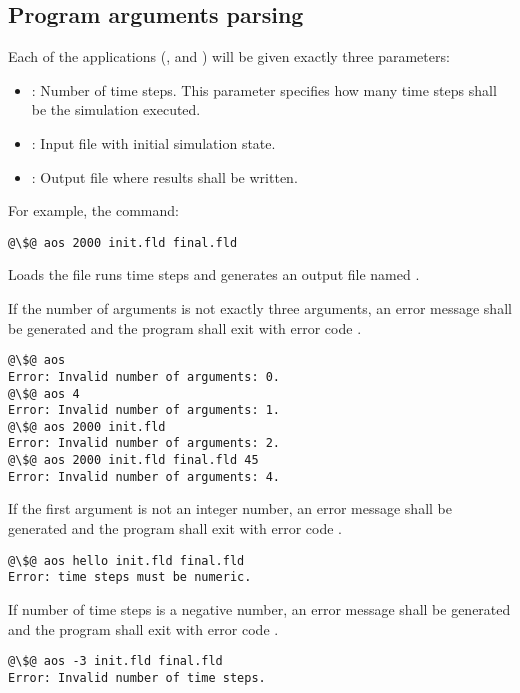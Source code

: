 \subsection{Program arguments parsing}

Each of the applications (, and
) will be given exactly three parameters:

\begin{itemize}
\item {}: Number of time steps. This parameter specifies how many
time steps shall be the simulation executed.
\item {}: Input file with initial simulation state.
\item {}: Output file where results shall be written.
\end{itemize}

For example, the command:

\begin{lstlisting}[style=terminal,escapechar=@]
@\$@ aos 2000 init.fld final.fld
\end{lstlisting}

Loads the file  runs  time steps and generates an
output file named .

If the number of arguments is not exactly three arguments, an error message
shall be generated and the program shall exit with error code .

\begin{lstlisting}[style=terminal,escapechar=@]
@\$@ aos 
Error: Invalid number of arguments: 0.
@\$@ aos 4
Error: Invalid number of arguments: 1.
@\$@ aos 2000 init.fld
Error: Invalid number of arguments: 2.
@\$@ aos 2000 init.fld final.fld 45
Error: Invalid number of arguments: 4.
\end{lstlisting}

If the first argument is not an integer number, an error message shall be
generated and the program shall exit with error code .

\begin{lstlisting}[style=terminal,escapechar=@]
@\$@ aos hello init.fld final.fld
Error: time steps must be numeric.
\end{lstlisting}

If number of time steps is a negative number, an error message shall be
generated and the program shall exit with error code .

\begin{lstlisting}[style=terminal,escapechar=@]
@\$@ aos -3 init.fld final.fld
Error: Invalid number of time steps.
\end{lstlisting}

